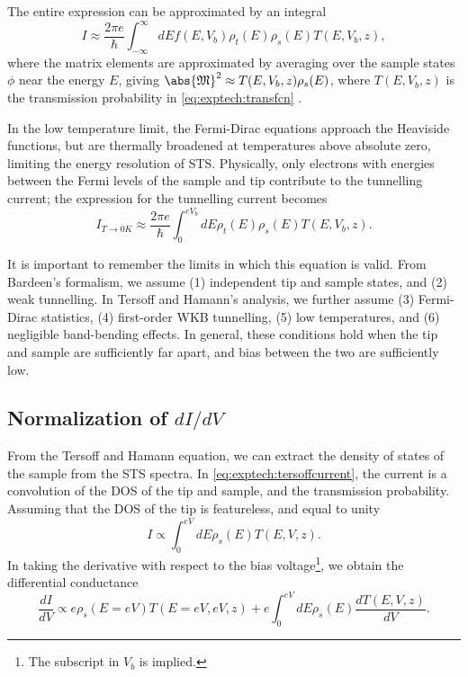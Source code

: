 The entire expression can be approximated by an integral
\begin{equation}
    I \approx \frac{2\pi e}{\hbar} \int_{-\infty}^\infty dE f(E,V_b) \rho_t(E)\rho_s(E) T(E,V_b,z),
\end{equation}
where the matrix elements are approximated by averaging over the sample states $\phi$ near the energy $E$, giving $\abs{\mathfrak{M}}^2 \approx T(E,V_b,z) \rho_s(E)$, where $T(E,V_b,z)$ is the transmission probability in \autoref{eq:exptech:transfcn} .

In the low temperature limit, the Fermi-Dirac equations approach the Heaviside functions, but are thermally broadened at temperatures above absolute zero, limiting the energy resolution of \ac{STS}. Physically, only electrons with energies between the Fermi levels of the sample and tip contribute to the tunnelling current; the expression for the tunnelling current becomes
\begin{equation} \label{eq:exptech:tersoffcurrent}
I_{T \rightarrow 0K} \approx \frac{2\pi e}{\hbar} \int_{0} ^{eV_b} dE \rho_{t}(E) \rho_{s}(E) T(E,V_b,z).
\end{equation}

It is important to remember the limits in which this equation is valid. From Bardeen's formalism, we assume (1) independent tip and sample states, and (2) weak tunnelling. In Tersoff and Hamann's analysis, we further assume (3) Fermi-Dirac statistics, (4) first-order \ac{WKB} tunnelling, (5) low temperatures, and (6) negligible band-bending effects. In general, these conditions hold when the tip and sample are sufficiently far apart, and bias between the two are sufficiently low.


\subsection{Normalization of $dI/dV$}

From the Tersoff and Hamann equation, we can extract the density of states of the sample from the \ac{STS} spectra. In \autoref{eq:exptech:tersoffcurrent}, the current is a convolution of the \ac{DOS} of the tip and sample, and the transmission probability. Assuming that the \ac{DOS} of the tip is featureless, and equal to unity
\begin{equation}
I \propto \int_0 ^{eV} dE \rho_s(E) T(E,V,z) .
\end{equation}
In taking the derivative with respect to the bias voltage\footnote{The subscript in $V_b$ is implied.}, we obtain the differential conductance
\begin{equation} \label{eq:exptech:didv}
\frac{dI}{dV} \propto e \rho_s(E=eV) T(E=eV,eV,z) + e \int_0^{eV} dE \rho_s(E) \frac{dT(E,V,z)}{dV}  .
\end{equation}

